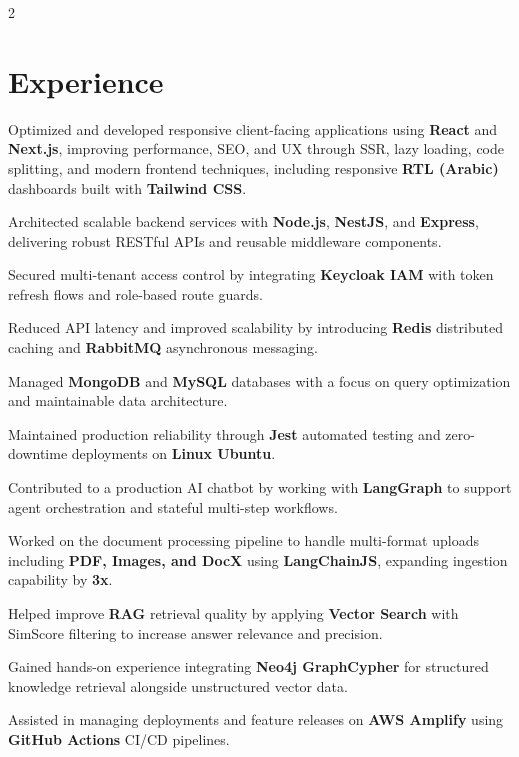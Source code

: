 \documentclass[]{deedy-resume-reversed}
\begin{document}
\begin{paracol}{2}

\section{Experience}

\vspace{2pt}
\begin{tightemize}
\item Optimized and developed responsive client-facing applications using \textbf{React} and \textbf{Next.js}, improving performance, SEO, and UX through SSR, lazy loading, code splitting, and modern frontend techniques, including responsive \textbf{RTL (Arabic)} dashboards built with \textbf{Tailwind CSS}.
\item Architected scalable backend services with \textbf{Node.js}, \textbf{NestJS}, and \textbf{Express}, delivering robust RESTful APIs and reusable middleware components.
\item Secured multi-tenant access control by integrating \textbf{Keycloak IAM} with token refresh flows and role-based route guards.
\item Reduced API latency and improved scalability by introducing \textbf{Redis} distributed caching and \textbf{RabbitMQ} asynchronous messaging.
\item Managed \textbf{MongoDB} and \textbf{MySQL} databases with a focus on query optimization and maintainable data architecture.
\item Maintained production reliability through \textbf{Jest} automated testing and zero-downtime deployments on \textbf{Linux Ubuntu}.
\end{tightemize}
\vspace{6pt}

\vspace{2pt}
\begin{tightemize}
\item Contributed to a production AI chatbot by working with \textbf{LangGraph} to support agent orchestration and stateful multi-step workflows.
\item Worked on the document processing pipeline to handle multi-format uploads including \textbf{PDF, Images, and DocX} using \textbf{LangChainJS}, expanding ingestion capability by \textbf{3x}.
\item Helped improve \textbf{RAG} retrieval quality by applying \textbf{Vector Search} with SimScore filtering to increase answer relevance and precision.
\item Gained hands-on experience integrating \textbf{Neo4j GraphCypher} for structured knowledge retrieval alongside unstructured vector data.
\item Assisted in managing deployments and feature releases on \textbf{AWS Amplify} using \textbf{GitHub Actions} CI/CD pipelines.
\end{tightemize}
\vspace{6pt}


\end{paracol}
\end{document}
